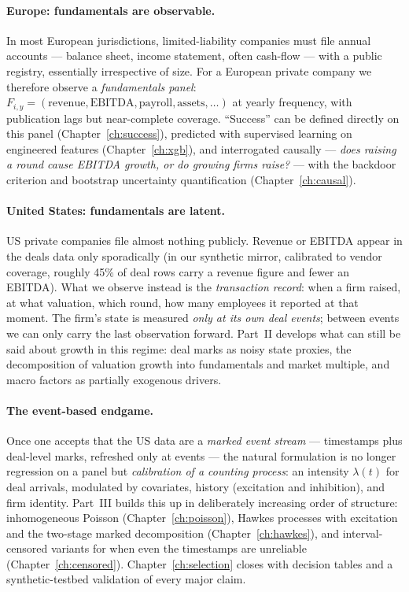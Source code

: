 \paragraph{Europe: fundamentals are observable.}
In most European jurisdictions, limited-liability companies must file annual accounts ---
balance sheet, income statement, often cash-flow --- with a public registry, essentially
irrespective of size. For a European private company we therefore observe a
\emph{fundamentals panel}: $F_{i,y} = (\text{revenue}, \text{EBITDA}, \text{payroll},
\text{assets}, \dots)$ at yearly frequency, with publication lags but near-complete
coverage. ``Success'' can be defined directly on this panel (Chapter~\ref{ch:success}),
predicted with supervised learning on engineered features (Chapter~\ref{ch:xgb}), and
interrogated causally --- \emph{does raising a round cause EBITDA growth, or do growing
firms raise?} --- with the backdoor criterion and bootstrap uncertainty quantification
(Chapter~\ref{ch:causal}).

\paragraph{United States: fundamentals are latent.}
US private companies file almost nothing publicly. Revenue or EBITDA appear in the deals
data only sporadically (in our synthetic mirror, calibrated to vendor coverage,
roughly 45\% of deal rows carry a revenue figure and fewer an EBITDA). What we observe
instead is the \emph{transaction record}: when a firm raised, at what valuation, which
round, how many employees it reported at that moment. The firm's state is measured
\emph{only at its own deal events}; between events we can only carry the last observation
forward. Part~II develops what can still be said about growth in this regime: deal marks
as noisy state proxies, the decomposition of valuation growth into fundamentals and market
multiple, and macro factors as partially exogenous drivers.

\paragraph{The event-based endgame.}
Once one accepts that the US data are a \emph{marked event stream} --- timestamps plus
deal-level marks, refreshed only at events --- the natural formulation is no longer
regression on a panel but \emph{calibration of a counting process}: an intensity
$\lambda(t)$ for deal arrivals, modulated by covariates, history (excitation and
inhibition), and firm identity. Part~III builds this up in deliberately increasing order
of structure: inhomogeneous Poisson (Chapter~\ref{ch:poisson}), Hawkes processes with
excitation and the two-stage marked decomposition (Chapter~\ref{ch:hawkes}), and
interval-censored variants for when even the timestamps are unreliable
(Chapter~\ref{ch:censored}). Chapter~\ref{ch:selection} closes with decision tables and a
synthetic-testbed validation of every major claim.

